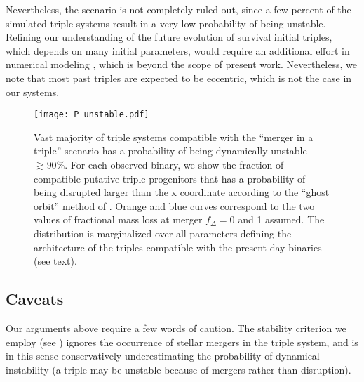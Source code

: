 \documentclass{aa}
\begin{document}
 Nevertheless, the scenario is not completely ruled out, since a few
 percent of the simulated triple systems result in a very low
 probability of being unstable.
Refining our understanding of the future evolution of survival initial triples, which depends on many initial parameters, would require an additional effort in numerical modeling \citep[e.g.][]{toonen:20,Dorozsmai_2024}, which is beyond the scope of present work.
Nevertheless, we note that most past triples are expected to be eccentric, which is not the case in our systems.

 \begin{figure}[htbp]
   \texttt{[image: P\_unstable.pdf]}
   \caption{Vast majority of triple systems compatible with the
     ``merger in a triple'' scenario has a probability of being
     dynamically unstable $\gtrsim90\%$. For each observed binary, we
     show the fraction of compatible putative triple progenitors that
     has a probability of being disrupted larger than the x coordinate
     according to the ``ghost orbit'' method of \cite{vynatheya:23}.
     Orange and blue curves correspond to the two values of fractional
     mass loss at merger $f_\Delta=0$ and 1 assumed. The distribution
     is marginalized over all parameters defining the architecture of
     the triples compatible with the present-day binaries (see text).}
   \label{fig:ML_stability}
 \end{figure}


 \subsection{Caveats}
\label{sec:caveats_triple}
Our arguments above require a few words of caution. The stability
criterion we employ (see \citealt{vynatheya:23}) ignores the
occurrence of stellar mergers in the triple system, and is in this
sense conservatively underestimating the probability of dynamical
instability (a triple may be unstable because of mergers rather than
disruption).
\end{document}
